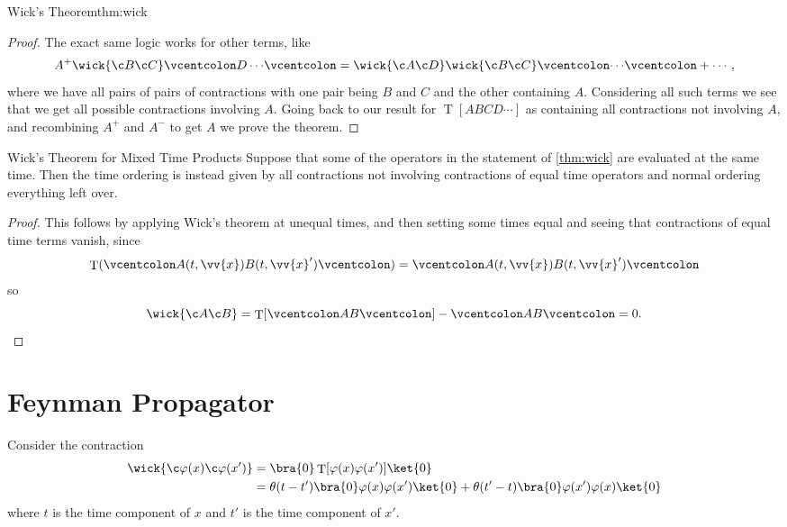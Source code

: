 \documentclass[fleqn]{NotesClass}
\newcommand{\normalordering}[1]{\mathopen{\vcentcolon}{#1}\mathclose{\vcentcolon}}
\newcommand{\heaviside}{\theta}
\DeclareMathOperator{\timeOrdering}{T}
\begin{document}
\begin{thm}{Wick's Theorem}{thm:wick}
\begin{proof}
            The exact same logic works for other terms, like
            \begin{equation}
                A^+ \wick{\c B \c C} \normalordering{D \dotsm} = \wick{\c A \c D} \wick{\c B \c C} \normalordering{\dotsm} + \dotsb,
            \end{equation}
            where we have all pairs of pairs of contractions with one pair being \(B\) and \(C\) and the other containing \(A\).
            Considering all such terms we see that we get all possible contractions involving \(A\).
            Going back to our result for \(\timeOrdering[ABCD\dotsm]\) as containing all contractions not involving \(A\), and recombining \(A^+\) and \(A^-\) to get \(A\) we prove the theorem.
        \end{proof}
    \end{thm}
    
    \begin{crl}{Wick's Theorem for Mixed Time Products}{}
        Suppose that some of the operators in the statement of \cref{thm:wick} are evaluated at the same time.
        Then the time ordering is instead given by all contractions not involving contractions of equal time operators and normal ordering everything left over.
        \begin{proof}
            This follows by applying Wick's theorem at unequal times, and then setting some times equal and seeing that contractions of equal time terms vanish, since
            \begin{equation}
                \timeOrdering(\normalordering{A(t, \vv{x})B(t, \vv{x}')}) = \normalordering{A(t, \vv{x})B(t, \vv{x}')}
            \end{equation}
            so
            \begin{equation}
                \wick{\c A \c B} = \timeOrdering[\normalordering{AB}] - \normalordering{AB} = 0.
            \end{equation}
        \end{proof}
    \end{crl}

    \section{Feynman Propagator}
    Consider the contraction
    \begin{align}
        \wick{\c \varphi(x) \c \varphi(x')} &= \bra{0} \timeOrdering[\varphi(x)\varphi(x')]\ket{0}\\
        &= \heaviside(t - t') \bra{0}  \varphi(x) \varphi(x')\ket{0} + \heaviside(t' - t) \bra{0} \varphi(x')\varphi(x)\ket{0}
    \end{align}
    where \(t\) is the time component of \(x\) and \(t'\) is the time component of \(x'\).
    
\end{document}
